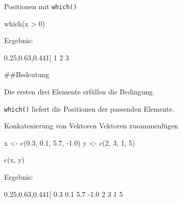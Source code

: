 \documentclass[
  10pt,
  ignorenonframetext,
  aspectratio=169,
]{beamer}
\newenvironment{Shaded}{}{}
\newcommand{\DecValTok}[1]{\textcolor[rgb]{0.25,0.63,0.44}{#1}}
\newcommand{\FloatTok}[1]{\textcolor[rgb]{0.25,0.63,0.44}{#1}}
\newcommand{\FunctionTok}[1]{\textcolor[rgb]{0.02,0.16,0.49}{#1}}
\newcommand{\NormalTok}[1]{#1}
\newcommand{\OtherTok}[1]{\textcolor[rgb]{0.00,0.44,0.13}{#1}}
\newcommand{\SpecialCharTok}[1]{\textcolor[rgb]{0.25,0.44,0.63}{#1}}
\begin{document}
\begin{frame}[fragile]{Positionen mit \texttt{which()}}
\label{positionen-mit-which}
\begin{Shaded}
\begin{Highlighting}[]
\FunctionTok{which}\NormalTok{(x }\SpecialCharTok{\textgreater{}} \DecValTok{0}\NormalTok{)}
\end{Highlighting}
\end{Shaded}

Ergebnis:

\begin{Shaded}
\begin{Highlighting}[]
\NormalTok{[}\DecValTok{1}\NormalTok{] }\DecValTok{1} \DecValTok{2} \DecValTok{3}
\end{Highlighting}
\end{Shaded}

\#\#Bedeutung

Die ersten drei Elemente erfüllen die Bedingung.

\texttt{which()} liefert die Positionen der passenden Elemente.
\end{frame}

\begin{frame}[fragile]{Konkatenierung von Vektoren}
\label{konkatenierung-von-vektoren}
Vektoren zusammenfügen

\begin{Shaded}
\begin{Highlighting}[]
\NormalTok{x }\OtherTok{\textless{}{-}} \FunctionTok{c}\NormalTok{(}\FloatTok{0.3}\NormalTok{, }\FloatTok{0.1}\NormalTok{, }\FloatTok{5.7}\NormalTok{, }\SpecialCharTok{{-}}\FloatTok{1.0}\NormalTok{)}
\NormalTok{y }\OtherTok{\textless{}{-}} \FunctionTok{c}\NormalTok{(}\DecValTok{2}\NormalTok{, }\DecValTok{3}\NormalTok{, }\DecValTok{1}\NormalTok{, }\DecValTok{5}\NormalTok{)}

\FunctionTok{c}\NormalTok{(x, y)}
\end{Highlighting}
\end{Shaded}

Ergebnis:

\begin{Shaded}
\begin{Highlighting}[]
\NormalTok{[}\DecValTok{1}\NormalTok{] }\FloatTok{0.3} \FloatTok{0.1} \FloatTok{5.7} \SpecialCharTok{{-}}\FloatTok{1.0} \DecValTok{2} \DecValTok{3} \DecValTok{1} \DecValTok{5}
\end{Highlighting}
\end{Shaded}
\end{frame}
\end{document}
